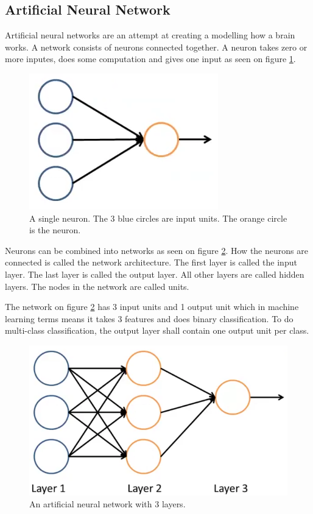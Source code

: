 
\subsection{Artificial Neural Network}
Artificial neural networks are an attempt at creating a modelling how a brain works.
A network consists of neurons connected together. 
A neuron takes zero or more inputes, does some computation and gives one input as seen on figure \ref{fig:neuron}.

\begin{figure}[H]
\centering
\includegraphics[scale=.5]{billeder/neuron}
\caption{A single neuron. The 3 blue circles are input units. The orange circle is the neuron.}
\label{fig:neuron}
\end{figure}

Neurons can be combined into networks as seen on figure \ref{fig:neural-network}.
How the neurons are connected is called the network architecture.
The first layer is called the input layer.
The last layer is called the output layer.
All other layers are called hidden layers.
The nodes in the network are called units.

The network on figure \ref{fig:neural-network} has 3 input units and 1 output unit which in machine learning terms means it takes 3 features and does binary classification.
To do multi-class classification, the output layer shall contain one output unit per class.

\begin{figure}[H]
\centering
\includegraphics[scale=.5]{billeder/neural-network}
\caption{An artificial neural network with 3 layers.}
\label{fig:neural-network}
\end{figure}

